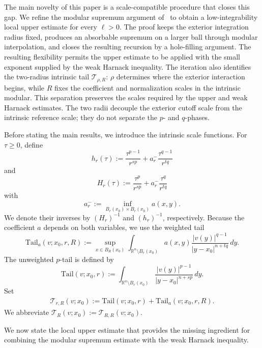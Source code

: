 \documentclass[reqno]{amsart}
\newcommand{\R}{\mathbb R}
\newcommand{\dd}{\,d}
\newcommand{\calT}{\mathcal T}
\theoremstyle{plain}
\theoremstyle{definition}
\theoremstyle{remark}
\numberwithin{equation}{section}
\begin{document}
The main novelty of this paper is a scale-compatible procedure that closes this gap.  We refine the modular supremum argument of~\cite[Theorem~2.10]{FKZ26} to obtain a low-integrability local upper estimate for every \(\ell>0\).  The proof keeps the exterior integration radius fixed, produces an absorbable supremum on a larger ball through modular interpolation, and closes the resulting recursion by a hole-filling argument.  The resulting flexibility permits the upper estimate to be applied with the small exponent supplied by the weak Harnack
inequality.  The iteration also identifies the two-radius intrinsic tail \(\calT_{\rho,R}\): \(\rho\) determines where the exterior interaction begins, while \(R\) fixes the coefficient and normalization scales in the intrinsic modular.  This separation preserves the scales required by the upper and weak Harnack estimates.  The two radii decouple the exterior cutoff scale from the intrinsic reference scale; they do not separate the \(p\)- and \(q\)-phases.


Before stating the main results, we introduce the intrinsic scale functions.
For \(\tau\ge0\), define
\begin{equation*}
h_r(\tau):=\frac{\tau^{p-1}}{r^{sp}}
    +a^-_r\frac{\tau^{q-1}}{r^{tq}}
\end{equation*}
and
\begin{equation*}
H_r(\tau):=\frac{\tau^p}{r^{sp}}
    +a^-_r\frac{\tau^q}{r^{tq}}
\end{equation*}
with
\begin{equation*}
a^-_r:=\inf_{B_r(x_0)\times B_r(x_0)} a(x,y).
\end{equation*}
We denote their inverses by \((H_r)^{-1}\) and \((h_r)^{-1}\),
respectively. Because the coefficient \(a\) depends on both variables, we use
the weighted tail
\[
\mathrm{Tail}_a(v;x_0,r,R)
:=\sup_{x\in B_R(x_0)}
\int_{\R^n\setminus B_r(x_0)}
a(x,y)\frac{|v(y)|^{q-1}}{|y-x_0|^{n+tq}}\dd y.
\]
The unweighted \(p\)-tail is defined by
\[
\mathrm{Tail}(v;x_0,r)
:=\int_{\R^n\setminus B_r(x_0)}
\frac{|v(y)|^{p-1}}{|y-x_0|^{n+sp}}\dd y.
\]
Set
\begin{align}\label{eq:two-radius-tail}
    \calT_{r,R}(v;x_0)
    :=\mathrm{Tail}(v;x_0,r)+\mathrm{Tail}_a(v;x_0,r,R).
\end{align}
We abbreviate \(\calT_R(v;x_0):=\calT_{R,R}(v;x_0)\).

We now state the local upper estimate that provides the missing ingredient for
combining the modular supremum estimate with the weak Harnack inequality.
\end{document}
